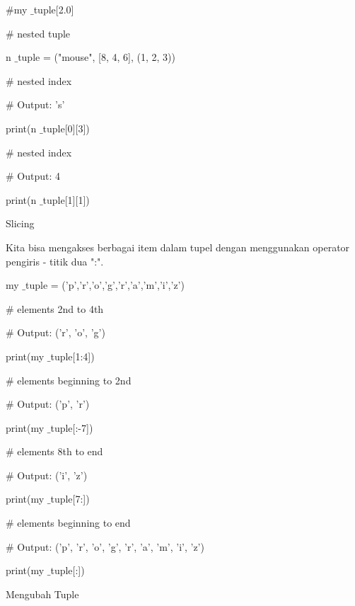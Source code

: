  $  \#  $my $  \_  $tuple[2.0] \par
\vspace{12pt}
 $  \#  $ nested tuple \par
n $  \_  $tuple = ("mouse", [8, 4, 6], (1, 2, 3)) \par
\vspace{12pt}
 $  \#  $ nested index \par
 $  \#  $ Output: 's' \par
print(n $  \_  $tuple[0][3]) \par
\vspace{12pt}
 $  \#  $ nested index \par
 $  \#  $ Output: 4 \par
print(n $  \_  $tuple[1][1]) \par
\vspace{12pt}
Slicing \par
\vspace{12pt}
Kita bisa mengakses berbagai item dalam tupel dengan menggunakan operator pengiris - titik dua ":". \par
\vspace{12pt}
my $  \_  $tuple = ('p','r','o','g','r','a','m','i','z') \par
\vspace{12pt}
 $  \#  $ elements 2nd to 4th \par
 $  \#  $ Output: ('r', 'o', 'g') \par
print(my $  \_  $tuple[1:4]) \par
\vspace{12pt}
 $  \#  $ elements beginning to 2nd \par
 $  \#  $ Output: ('p', 'r') \par
print(my $  \_  $tuple[:-7]) \par
\vspace{12pt}
 $  \#  $ elements 8th to end \par
 $  \#  $ Output: ('i', 'z') \par
print(my $  \_  $tuple[7:]) \par
\vspace{12pt}
 $  \#  $ elements beginning to end \par
 $  \#  $ Output: ('p', 'r', 'o', 'g', 'r', 'a', 'm', 'i', 'z') \par
print(my $  \_  $tuple[:]) \par
\vspace{12pt}
Mengubah Tuple \par
\vspace{12pt}
